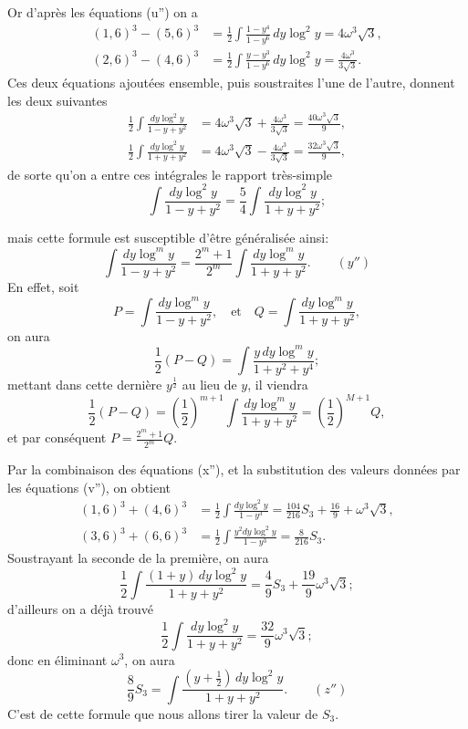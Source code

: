 \documentclass{article}
\begin{document}
Or d'après les équations (u'') on a
\[ \begin{aligned} (1,6)^{3}-(5,6)^{3}&=\frac{1}{2}\int\frac{1-y^{4}}{1-y^{6}}\,dy\log^{2}y=4\omega^{3}\sqrt{3},\\ (2,6)^{3}-(4,6)^{3}&=\frac{1}{2}\int\frac{y-y^{3}}{1-y^{6}}\,dy\log^{2}y=\frac{4\omega^{3}}{3\sqrt{3}}. \end{aligned} \]
Ces deux équations ajoutées ensemble, puis soustraites l'une de l'autre, donnent les deux suivantes
\[ \begin{aligned} \frac{1}{2}\int\frac{dy\log^{2}y}{1-y+y^{2}}&=4\omega^{3}\sqrt{3}+\frac{4\omega^{3}}{3\sqrt{3}}=\frac{40\omega^{3}\sqrt{3}}{9},\\ \frac{1}{2}\int\frac{dy\log^{2}y}{1+y+y^{2}}&=4\omega^{3}\sqrt{3}-\frac{4\omega^{3}}{3\sqrt{3}}=\frac{32\omega^{3}\sqrt{3}}{9}, \end{aligned} \]
de sorte qu'on a entre ces intégrales le rapport très-simple
\[ \int\frac{dy\log^{2}y}{1-y+y^{2}}=\frac{5}{4}\int\frac{dy\log^{2}y}{1+y+y^{2}}; \]

mais cette formule est susceptible d'être généralisée ainsi:
\[ \int\frac{dy\log^{m}y}{1-y+y^{2}}=\frac{2^{m}+1}{2^{m}}\int\frac{dy\log^{m}y}{1+y+y^{2}}.\qquad(y'') \]
En effet, soit
\[ P=\int\frac{dy\log^{m}y}{1-y+y^{2}},\quad\text{et}\quad Q=\int\frac{dy\log^{m}y}{1+y+y^{2}}, \]
on aura
\[ \frac{1}{2}(P-Q)=\int\frac{y\,dy\log^{m}y}{1+y^{2}+y^{4}}; \]
mettant dans cette dernière $y^{\frac{1}{2}}$ au lieu de $y$, il viendra
\[ \frac{1}{2}(P-Q)=\left(\frac{1}{2}\right)^{m+1}\int\frac{dy\log^{m}y}{1+y+y^{2}}=\left(\frac{1}{2}\right)^{M+1}Q, \]
et par conséquent $P=\frac{2^{m}+1}{2^{m}}Q$.

Par la combinaison des équations (x''), et la substitution des valeurs données par les équations (v''), on obtient
\[ \begin{aligned} (1,6)^{3}+(4,6)^{3}&=\frac{1}{2}\int\frac{dy\log^{2}y}{1-y^{3}}=\frac{104}{216}S_{3}+\frac{16}{9}+\omega^{3}\sqrt{3},\\ (3,6)^{3}+(6,6)^{3}&=\frac{1}{2}\int\frac{y^{2}dy\log^{2}y}{1-y^{3}}=\frac{8}{216}S_{3}. \end{aligned} \]
Soustrayant la seconde de la première, on aura
\[ \frac{1}{2}\int\frac{(1+y)\,dy\log^{2}y}{1+y+y^{2}}=\frac{4}{9}S_{3}+\frac{19}{9}\omega^{3}\sqrt{3}; \]
d'ailleurs on a déjà trouvé
\[ \frac{1}{2}\int\frac{dy\log^{2}y}{1+y+y^{2}}=\frac{32}{9}\omega^{3}\sqrt{3}; \]
donc en éliminant $\omega^{3}$, on aura
\[ \frac{8}{9}S_{3}=\int\frac{(y+\frac{1}{2})\,dy\log^{2}y}{1+y+y^{2}}.\qquad(z'') \]
C'est de cette formule que nous allons tirer la valeur de $S_{3}$.
\end{document}
